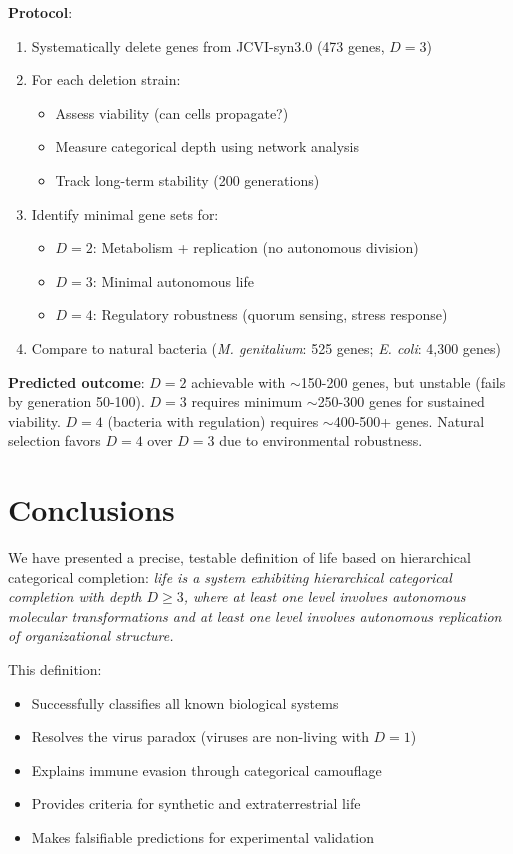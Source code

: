 \documentclass[11pt]{article}
\begin{document}
\textbf{Protocol}:
\begin{enumerate}
\item Systematically delete genes from JCVI-syn3.0 (473 genes, $D = 3$)
\item For each deletion strain:
\begin{itemize}
\item Assess viability (can cells propagate?)
\item Measure categorical depth using network analysis
\item Track long-term stability (200 generations)
\end{itemize}
\item Identify minimal gene sets for:
\begin{itemize}
\item $D = 2$: Metabolism + replication (no autonomous division)
\item $D = 3$: Minimal autonomous life
\item $D = 4$: Regulatory robustness (quorum sensing, stress response)
\end{itemize}
\item Compare to natural bacteria (\textit{M. genitalium}: 525 genes; \textit{E. coli}: 4,300 genes)
\end{enumerate}

\textbf{Predicted outcome}: $D = 2$ achievable with $\sim$150-200 genes, but unstable (fails by generation 50-100). $D = 3$ requires minimum $\sim$250-300 genes for sustained viability. $D = 4$ (bacteria with regulation) requires $\sim$400-500+ genes. Natural selection favors $D = 4$ over $D = 3$ due to environmental robustness.

\section{Conclusions}

We have presented a precise, testable definition of life based on hierarchical categorical completion: \textit{life is a system exhibiting hierarchical categorical completion with depth $D \geq 3$, where at least one level involves autonomous molecular transformations and at least one level involves autonomous replication of organizational structure.}

This definition:
\begin{itemize}
\item Successfully classifies all known biological systems
\item Resolves the virus paradox (viruses are non-living with $D = 1$)
\item Explains immune evasion through categorical camouflage
\item Provides criteria for synthetic and extraterrestrial life
\item Makes falsifiable predictions for experimental validation
\end{itemize}
\end{document}
